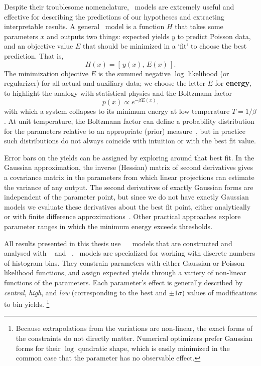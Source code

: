 Despite their troublesome nomenclature, \heplikelihood\ models are extremely
useful and effective for describing the predictions of our hypotheses and
extracting interpretable results.
A general \heplikelihood\ model is a function $H$ that takes some parameters $x$
and outputs two things:
expected yields $y$ to predict Poisson data,
and an objective value $E$ that should be minimized in a `fit' to choose the
best prediction.
That is,
\begin{equation}
H(x) = [\,y(x), \,E(x)\,]
.
\end{equation}
The minimization objective $E$ is the summed negative $\log$ likelihood
(or regularizer) for all actual and auxiliary data;
we choose the letter $E$ for \textbf{energy}, to highlight the analogy with
statistical physics and the Boltzmann factor
\begin{equation}
p(x) \propto e^{-\beta E(x)}
.
\end{equation}
with which a system collapses to its minimum energy at low temperature
$T = 1/\beta$.
At unit temperature, the Boltzmann factor can define a probability distribution
for the parameters relative to an appropriate (prior)
measure~\cite{cranmer2012histfactory, skilling2017david},
but in practice such distributions do not always coincide with intuition or
with the best fit value.

Error bars on the yields can be assigned by exploring around that best fit.
In the Gaussian approximation, the inverse (Hessian) matrix of second
derivatives gives a covariance matrix in the parameters from which linear
projections can estimate the variance of any output.
The second derivatives of exactly Gaussian forms are independent of the
parameter point, but since we do not have exactly Gaussian models we evaluate
these derivatives about the best fit point, either analytically or with finite
difference approximations~\cite{cranmer2021building}.
Other practical approaches explore parameter ranges in which the minimum energy
exceeds thresholds.

All results presented in this thesis use
\histfactory~\cite{cranmer2012histfactory} \heplikelihood\ models that are
constructed and analysed with
\histfitter~\cite{Besjes_2015,baak2015histfitter}
and \pyhf~\cite{heinrich2021pyhf}.
\histfactory\ models are specialized for working with discrete numbers of
histogram bins.
They constrain parameters with either Gaussian or Poisson likelihood
functions, and assign expected yields through a variety of
non-linear functions of the parameters.
Each parameter's effect is generally described by
\emph{central}, \emph{high}, and \emph{low}
(corresponding to the best and $\pm1\sigma$)
values of modifications to bin yields.%
\footnote{%
Because extrapolations from the variations are non-linear, the exact forms of
the constraints do not directly matter.
Numerical optimizers prefer Gaussian forms for their $\log$ quadratic shape, which is
easily minimized in the common case that the parameter has no observable
effect.%
}

